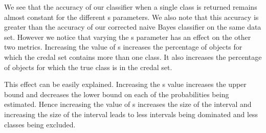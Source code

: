 We see that the accuracy of our classifier when a single class is returned remains almost constant for the different s parameters.
We also note that this accuracy is greater than the accuracy of our corrected naive Bayes classifier on the same data set.
However we notice that varying the s parameter has an effect on the other two metrics.
Increasing the value of s increases the percentage of objects for which the credal set contains more than one class.
It also increases the percentage of objects for which the true class is in the credal set.

This effect can be easily explained.
Increasing the s value increases the upper bound and decreases the lower bound on each of the probabilities being estimated.
Hence increasing the value of s increases the size of the interval and increasing the size of the interval leads to less intervals being dominated and less classes being excluded.